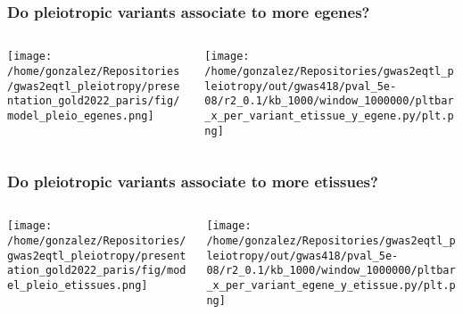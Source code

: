 \documentclass{beamer}
\begin{document}
\begin{frame}
\frametitle{Do pleiotropic variants associate to more egenes?}

\begin{columns}
\begin{column}{0.5\textwidth}
    \begin{center}
\texttt{[image: /home/gonzalez/Repositories/gwas2eqtl\_pleiotropy/presentation\_gold2022\_paris/fig/model\_pleio\_egenes.png]}
     \end{center}
\end{column}
\begin{column}{0.5\textwidth}  %
    \begin{center}
\texttt{[image: /home/gonzalez/Repositories/gwas2eqtl\_pleiotropy/out/gwas418/pval\_5e-08/r2\_0.1/kb\_1000/window\_1000000/pltbar\_x\_per\_variant\_etissue\_y\_egene.py/plt.png]}
     \end{center}
\end{column}
\end{columns}

\end{frame}

\begin{frame}
\frametitle{Do pleiotropic variants associate to more etissues?}

\begin{columns}
\begin{column}{0.5\textwidth}
    \begin{center}
\texttt{[image: /home/gonzalez/Repositories/gwas2eqtl\_pleiotropy/presentation\_gold2022\_paris/fig/model\_pleio\_etissues.png]}
     \end{center}
\end{column}
\begin{column}{0.5\textwidth}  %
    \begin{center}
\texttt{[image: /home/gonzalez/Repositories/gwas2eqtl\_pleiotropy/out/gwas418/pval\_5e-08/r2\_0.1/kb\_1000/window\_1000000/pltbar\_x\_per\_variant\_egene\_y\_etissue.py/plt.png]}
     \end{center}
\end{column}
\end{columns}

\end{frame}
\end{document}
